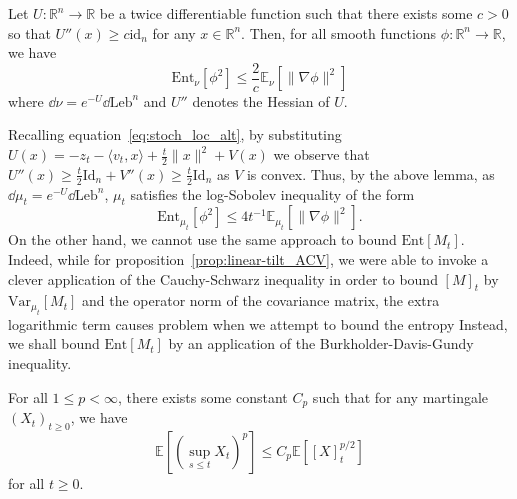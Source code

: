 \begin{lemma}\label{lem:entropy_BL}
  Let \(U : \mathbb{R}^n \to \mathbb{R}\) be a twice differentiable function such that
  there exists some \(c > 0\) so that \(U''(x) \ge c\text{id}_n\) for any \(x \in \mathbb{R}^n\). 
  Then, for all smooth functions
  \(\phi : \mathbb{R}^n \to \mathbb{R}\), we have 
  \[\text{Ent}_\nu[\phi^2] \le \frac{2}{c}\mathbb{E}_\nu[\|\nabla\phi\|^2]\]
  where \(\dd \nu = e^{-U} \dd \text{Leb}^n\) and \(U''\) denotes the Hessian of \(U\).
\end{lemma}

Recalling equation~\eqref{eq:stoch_loc_alt}, by substituting \(U(x) = - z_t - \langle v_t, x\rangle + \frac{t}{2}\|x\|^2 + V(x)\)
we observe that \(U''(x) \ge \frac{t}{2}\text{Id}_n + V''(x) \ge \frac{t}{2}\text{Id}_n\) as \(V\) is convex.
Thus, by the above lemma, as \(\dd \mu_t = e^{-U} \dd \text{Leb}^n\), \(\mu_t\) satisfies the log-Sobolev 
inequality of the form
\begin{equation}
  \text{Ent}_{\mu_t}[\phi^2] \le 4t^{-1} \mathbb{E}_{\mu_t}[\|\nabla \phi\|^2].
\end{equation} 
On the other hand, we cannot use the same approach to bound \(\text{Ent}[M_t]\). Indeed, while for 
proposition~\ref{prop:linear-tilt_ACV}, we were able to invoke a clever application of the Cauchy-Schwarz inequality 
in order to bound \([M]_t\) by \(\text{Var}_{\mu_t}[M_t]\) and the operator norm of the covariance matrix, the extra logarithmic term causes problem 
when we attempt to bound the entropy%
Instead, we shall bound \(\text{Ent}[M_t]\) by an application of the Burkholder-Davis-Gundy inequality. 

\begin{lemma}
  For all \(1 \le p < \infty\), there exists some constant \(C_p\) such that for any martingale \((X_t)_{t \ge 0}\),
  we have 
  \[\mathbb{E}\left[\left(\sup_{s \le t} X_t\right)^p\right] \le C_p \mathbb{E}\left[[X]_t^{p / 2}\right]\]
  for all \(t \ge 0\).
\end{lemma}

